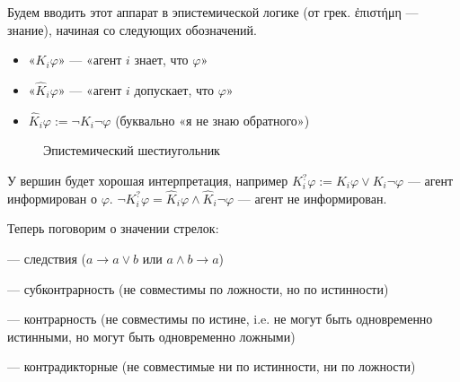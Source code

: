 \documentclass[openany]{book}
\theoremstyle{plain}
\theoremstyle{definition}
\begin{document}
Будем вводить этот аппарат в эпистемической логике (от грек. \textgreek{ἐπιστήμη} --- знание), начиная со следующих обозначений.
\begin{itemize}
    \item «\(K_i \varphi\)» — «агент \(i\) знает, что \(\varphi\)»
    \item «\(\hat{K}_i \varphi\)» — «агент \(i\) допускает, что \(\varphi\)»
    \item \(\hat{K}_i \varphi := \neg K_i \neg \varphi\) (буквально «я не знаю обратного»)
\end{itemize}

\begin{figure}[H]
    \centering
    \caption{Эпистемический шестиугольник}
\end{figure}


У вершин будет хорошая интерпретация, например \(K^{?}_i \varphi := K_i \varphi \lor K_i \neg \varphi\) — агент информирован о \(\varphi\). \(\neg K^{?}_i \varphi = \hat{K}_i \varphi \land \hat{K}_i \neg \varphi\) — агент не информирован.

Теперь поговорим о значении стрелок:
\begin{itemize}
     — следствия (\(a \to a \lor b\) или \(a \land b \to a\))

     — субконтрарность (не совместимы по ложности, но по истинности)

     — контрарность (не совместимы по истине, i.e. не могут быть одновременно истинными, но могут быть одновременно ложными)

     — контрадикторные (не совместимые ни по истинности, ни по ложности)
\end{itemize}
\end{document}
